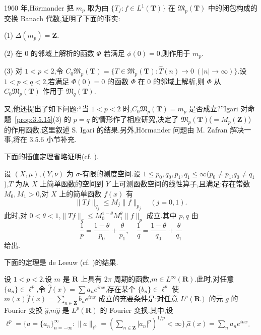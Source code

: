 1960 年,Hörmander \cite{ch3:22} 把 $m_p$ 取为由 $\{T_f : f \in L^1(\mathbf{T})\}$ 在 $\mathfrak{M}_p(\mathbf{T})$ 中的闭包构成的交换 Banach 代数,证明了下面的事实:

\begin{proposition}\label{prop:3.5.15}
(1) $\Delta(m_p) = \mathbf{Z}$.

(2) 在 0 的邻域上解析的函数 $\Phi$ 若满足 $\phi(0) = 0$,则作用于 $m_{p}$.

(3) 对 $1 < p < 2$,令 $C_{0}\mathfrak{M}_{p}(\mathbf{T}) = \{T \in \mathfrak{M}_{p}(\mathbf{T}): \hat{T}(n) \to 0 \ (|n| \to \infty)\}$.设 $1 < p < q < 2$,若满足 $\Phi(0) = 0$ 的函数 $\Phi$ 在 0 的邻域上解析,则 $\Phi$ 从 $C_{0}\mathfrak{M}_{p}(\mathbf{T})$ 作用于 $\mathfrak{M}_{q}(\mathbf{T})$.
\end{proposition}

又,他还提出了如下问题:``当 $1 < p < 2$ 时,$C_{0}\mathfrak{M}_{p}(\mathbf{T}) = m_{p}$ 是否成立?''Igari \cite{ch3:25} 对命题~\ref{prop:3.5.15}(3) 的 $p = q$ 的情形作了相应研究,决定了 $\mathfrak{M}_{p}(\mathbf{T})$($= M_{p}(\mathbf{Z})$)的作用函数.这里叙述 S. Igari 的结果.另外,Hörmander 问题由 M. Zafran 解决一事,将在 3.5.6 小节补充.

下面的插值定理省略证明(cf. \cite{ch3:4}).

\begin{theorem}\label{thm:3.5.16}
设 $(X, \mu)$,$(Y, \nu)$ 为 $\sigma$-有限的测度空间.设 $1 \leq p_{0}, q_{0}, p_{1}, q_{1} \leq \infty$($p_{0} \neq p_{1}$,$q_{0} \neq q_{1}$),$T$ 为从 $X$ 上简单函数的空间到 $Y$ 上可测函数空间的线性算子,且满足:存在常数 $M_{0}, M_{1} > 0$,对 $X$ 上的简单函数 $f(x)$ 有
\begin{equation*}
\|Tf\|_{q_{j}} \leq M_{j}\|f\|_{p_{j}} \quad (j = 0, 1).
\end{equation*}
此时,对 $0 < \theta < 1$,$\|Tf\|_{q} \leq M_{0}^{1-\theta}M_{1}^{\theta}\|f\|_{p}$ 成立.其中 $p, q$ 由
\begin{equation*}
\frac{1}{p} = \frac{1 - \theta}{p_{0}} + \frac{\theta}{p_{1}}, \quad \frac{1}{q} = \frac{1 - \theta}{q_{0}} + \frac{\theta}{q_{1}}
\end{equation*}
给出.
\end{theorem}

下面的定理是 de Leeuw \cite{ch3:17}(cf. \cite{ch3:27})的结果.

\begin{theorem}\label{thm:3.5.17}
设 $1 < p < 2$.设 $m$ 是 $\mathbf{R}$ 上具有 $2\pi$ 周期的函数,$m \in L^{\infty}(\mathbf{R})$.此时,对任意 $\{a_{n}\} \in \ell^{p}$,令 $\hat{f}(x) = \sum a_{n}e^{inx}$,存在某个 $\{b_{n}\} \in \ell^{p}$ 使 $m(x)\hat{f}(x) = \sum_{n \in \mathbf{Z}}b_{n}e^{inx}$ 成立的充要条件是:对任意 $L^{p}(\mathbf{R})$ 的元 $g$ 的 Fourier 变换 $\hat{g}$,$m\hat{g}$ 是 $L^{p}(\mathbf{R})$ 的 Fourier 变换.其中,设 $\ell^{p} = \{a = \{a_{n}\}_{n=-\infty}^{\infty}: \|a\|_{\ell^{p}} = (\sum_{n \in \mathbf{Z}}|a_{n}|^{p})^{1/p} < \infty\}$,$\hat{a}(x) = \sum_{n}a_{n}e^{inx}$.
\end{theorem}

